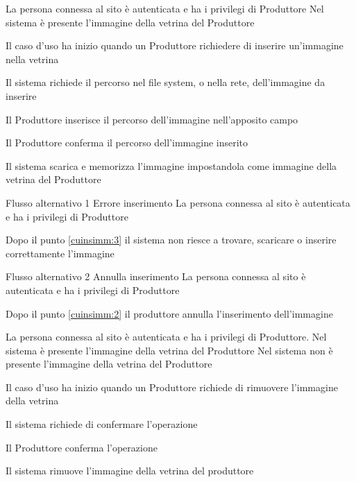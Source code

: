 {}
{La persona connessa al sito è autenticata e ha i privilegi di Produttore}
{Nel sistema è presente l'immagine della vetrina del Produttore}
{\begin{enumCU}
		\item Il caso d'uso ha inizio quando un Produttore richiedere di inserire un'immagine nella vetrina
		\item Il sistema richiede il percorso nel file system, o nella rete, dell'immagine da inserire 
		\item Il Produttore inserisce il percorso dell'immagine nell'apposito campo \label{cuinsimm:2}
		\item Il Produttore conferma il percorso dell'immagine inserito \label{cuinsimm:3}
		\item Il sistema scarica e memorizza l'immagine impostandola come immagine della vetrina del Produttore
	\end{enumCU}}
%
{Flusso alternativo 1}%
{Errore inserimento}%
{La persona connessa al sito è autenticata e ha i privilegi di Produttore}%
{\postNulle}%
{\begin{enumCU}
		\item Dopo il punto \ref{cuinsimm:3} il sistema non riesce a trovare, scaricare o inserire correttamente l'immagine
	\end{enumCU}}%
%
{Flusso alternativo 2}%
{Annulla inserimento}%
{La persona connessa al sito è autenticata e ha i privilegi di Produttore}%
{\postNulle}%
{\begin{enumCU}
		\item Dopo il punto \ref{cuinsimm:2} il produttore annulla l'inserimento dell'immagine
	\end{enumCU}}%

\tabcuvspace

{}
{La persona connessa al sito è autenticata e ha i privilegi di Produttore. Nel sistema è presente l'immagine della vetrina del Produttore}
{Nel sistema non è presente l'immagine della vetrina del Produttore}
{\begin{enumCU}
		\item Il caso d'uso ha inizio quando un Produttore richiede di rimuovere l'immagine della vetrina
		\item Il sistema richiede di confermare l'operazione \label{cudelimm:2}
		\item Il Produttore conferma l'operazione
		\item Il sistema rimuove l'immagine della vetrina del produttore
	\end{enumCU}}

